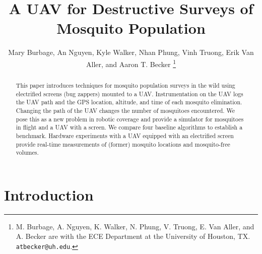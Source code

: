 \documentclass[letterpaper, 10 pt, conference]{ieeeconf}  %
\title{\LARGE \bf
A UAV for Destructive Surveys of Mosquito Population
}
\author{Mary Burbage, An Nguyen, Kyle Walker, Nhan Phung, Vinh Truong, Erik Van Aller, and Aaron T. Becker%
\thanks{M. Burbage, A. Nguyen, K. Walker, N. Phung, V. Truong, E. Van Aller, and A. Becker are with the ECE Department at the University of Houston, TX.
        {\tt\small atbecker@uh.edu}.}%
}
\begin{document}
\maketitle
\thispagestyle{empty}
\pagestyle{empty}


\begin{abstract}
This paper introduces techniques for mosquito population surveys in the wild using electrified screens (bug zappers) mounted to a UAV. Instrumentation on the UAV logs the UAV path and the GPS location, altitude, and time of each mosquito elimination. Changing the path of the UAV changes the number of mosquitoes encountered.  We pose this as a new problem in robotic coverage and provide a simulator for mosquitoes in flight and a UAV with a screen. We compare four baseline algorithms to establish a benchmark.
  Hardware experiments with a UAV equipped with an electrified screen provide real-time measurements of (former) mosquito locations and mosquito-free volumes. 
\end{abstract}




\section{Introduction}
\end{document}
